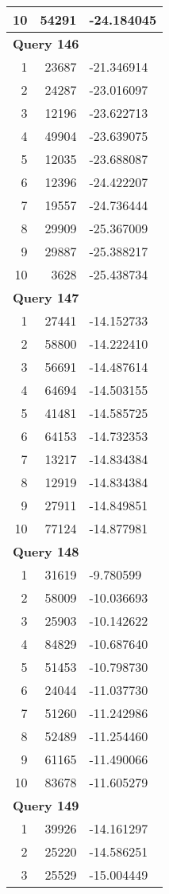 \begin{longtable}[{p}]{@{}rrp{}@{}}
10 & 54291 & -24.184045 \\
\midrule
\multicolumn{3}{l}{\bfseries Query 146} \\
1 & 23687 & -21.346914 \\
2 & 24287 & -23.016097 \\
3 & 12196 & -23.622713 \\
4 & 49904 & -23.639075 \\
5 & 12035 & -23.688087 \\
6 & 12396 & -24.422207 \\
7 & 19557 & -24.736444 \\
8 & 29909 & -25.367009 \\
9 & 29887 & -25.388217 \\
10 & 3628 & -25.438734 \\
\midrule
\multicolumn{3}{l}{\bfseries Query 147} \\
1 & 27441 & -14.152733 \\
2 & 58800 & -14.222410 \\
3 & 56691 & -14.487614 \\
4 & 64694 & -14.503155 \\
5 & 41481 & -14.585725 \\
6 & 64153 & -14.732353 \\
7 & 13217 & -14.834384 \\
8 & 12919 & -14.834384 \\
9 & 27911 & -14.849851 \\
10 & 77124 & -14.877981 \\
\midrule
\multicolumn{3}{l}{\bfseries Query 148} \\
1 & 31619 & -9.780599 \\
2 & 58009 & -10.036693 \\
3 & 25903 & -10.142622 \\
4 & 84829 & -10.687640 \\
5 & 51453 & -10.798730 \\
6 & 24044 & -11.037730 \\
7 & 51260 & -11.242986 \\
8 & 52489 & -11.254460 \\
9 & 61165 & -11.490066 \\
10 & 83678 & -11.605279 \\
\midrule
\multicolumn{3}{l}{\bfseries Query 149} \\
1 & 39926 & -14.161297 \\
2 & 25220 & -14.586251 \\
3 & 25529 & -15.004449 \\

\end{longtable}
